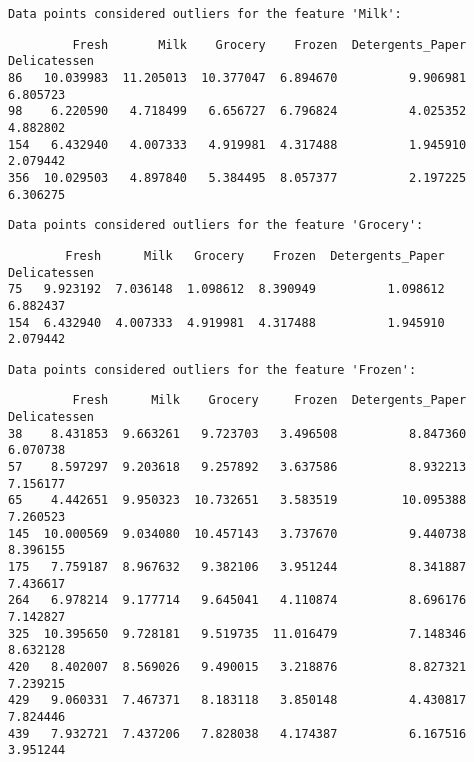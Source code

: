 \documentclass[11pt]{article}
\begin{document}
    
    \begin{Verbatim}[commandchars=\\\{\}]
Data points considered outliers for the feature 'Milk':

    \end{Verbatim}

    
    \begin{verbatim}
         Fresh       Milk    Grocery    Frozen  Detergents_Paper  Delicatessen
86   10.039983  11.205013  10.377047  6.894670          9.906981      6.805723
98    6.220590   4.718499   6.656727  6.796824          4.025352      4.882802
154   6.432940   4.007333   4.919981  4.317488          1.945910      2.079442
356  10.029503   4.897840   5.384495  8.057377          2.197225      6.306275
    \end{verbatim}

    
    \begin{Verbatim}[commandchars=\\\{\}]
Data points considered outliers for the feature 'Grocery':

    \end{Verbatim}

    
    \begin{verbatim}
        Fresh      Milk   Grocery    Frozen  Detergents_Paper  Delicatessen
75   9.923192  7.036148  1.098612  8.390949          1.098612      6.882437
154  6.432940  4.007333  4.919981  4.317488          1.945910      2.079442
    \end{verbatim}

    
    \begin{Verbatim}[commandchars=\\\{\}]
Data points considered outliers for the feature 'Frozen':

    \end{Verbatim}

    
    \begin{verbatim}
         Fresh      Milk    Grocery     Frozen  Detergents_Paper  Delicatessen
38    8.431853  9.663261   9.723703   3.496508          8.847360      6.070738
57    8.597297  9.203618   9.257892   3.637586          8.932213      7.156177
65    4.442651  9.950323  10.732651   3.583519         10.095388      7.260523
145  10.000569  9.034080  10.457143   3.737670          9.440738      8.396155
175   7.759187  8.967632   9.382106   3.951244          8.341887      7.436617
264   6.978214  9.177714   9.645041   4.110874          8.696176      7.142827
325  10.395650  9.728181   9.519735  11.016479          7.148346      8.632128
420   8.402007  8.569026   9.490015   3.218876          8.827321      7.239215
429   9.060331  7.467371   8.183118   3.850148          4.430817      7.824446
439   7.932721  7.437206   7.828038   4.174387          6.167516      3.951244
    \end{verbatim}
\end{document}
